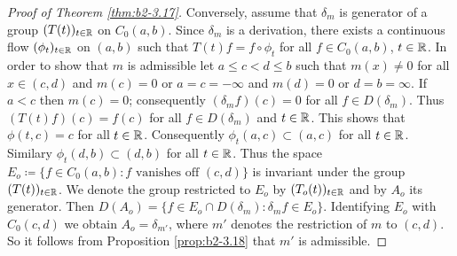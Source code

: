 \begin{proof}[Proof of Theorem \ref{thm:b2-3.17}]
Conversely, assume that $\delta_{m}$ is generator of a group $(T(t))_{t \in \mathbb{R}}$ on $C_{0}(a,b)$.
Since $\delta_{m}$ is a derivation, there exists a continuous flow $(\phi_{t})_{t \in \mathbb{R}}$ on $(a,b)$ such that $T(t)f = f \circ \phi_{t}$ for all $f \in C_{0}(a,b)$, $t \in \mathbb{R}$.
In order to show that $m$ is admissible let $a \leq c < d \leq b$ such that $m(x) \neq 0$ for all $x \in (c,d)$ and $m(c) = 0$ or $a = c = -\infty$ and $m(d) = 0$ or $d = b = \infty$.
If $a < c$ then $m(c) = 0$; consequently $(\delta_{m}f)(c) = 0$ for all $f \in D(\delta_{m})$.
Thus $(T(t)f)(c) = f(c)$ for all $f \in D(\delta_{m})$ and $t \in \mathbb{R}$.
This shows that $\phi(t,c) = c$ for all $t \in \mathbb{R}$.
Consequently $\phi_{t}(a,c) \subset (a,c)$ for all $t \in \mathbb{R}$.
Similary $\phi_{t}(d,b) \subset (d,b)$ for all $t \in \mathbb{R}$.
Thus the space $E_{o} \coloneqq \{f \in C_{0}(a,b) \colon f \text{ vanishes off } (c,d)\}$ is invariant under the group $(T(t))_{t \in \mathbb{R}}$.
We denote the group restricted to $E_{o}$ by $(T_{o}(t))_{t \in \mathbb{R}}$ and by $A_{o}$ its generator.
Then $D(A_{o}) = \{f \in E_{o} \cap D(\delta_{m}) \colon \delta_{m}f \in E_{o}\}$.
Identifying $E_{o}$ with $C_{0}(c,d)$ we obtain $A_{o} = \delta_{m'}$, where $m'$ denotes the restriction of $m$ to $(c,d)$.
So it follows from Proposition \ref{prop:b2-3.18} that $m'$ is admissible.
\end{proof}

